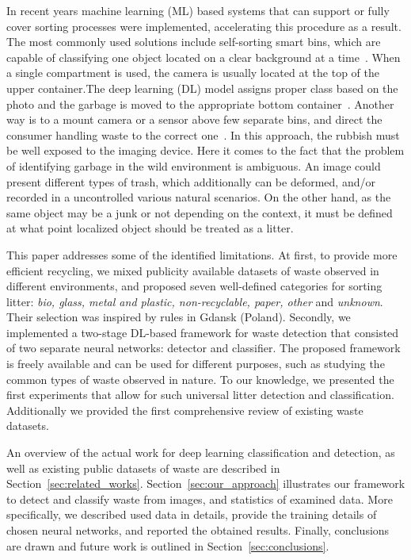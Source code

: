 \documentclass{article}
\begin{document}
In recent years machine learning (ML) based systems that can support or fully cover sorting processes were implemented, accelerating this procedure as a result. The most commonly used solutions include self-sorting smart bins, which are capable of classifying one object located on a clear background at a time~\cite{white2020wastenet,Sheng2020}. When a single compartment is used, the camera is usually located at the top of the upper container.The deep learning (DL) model assigns proper class based on the photo and the garbage is moved to the appropriate bottom container~\cite{white2020wastenet}. Another way is to a mount camera or a sensor above few separate bins, and direct the consumer handling waste to the correct one~\cite{IoWT2018}. In this approach, the rubbish must be well exposed to the imaging device. Here it comes to the fact that the problem of identifying garbage in the wild environment is ambiguous. An image could present different types of trash, which additionally can be deformed, and/or recorded in a uncontrolled various natural scenarios. On the other hand, as the same object may be a junk or not depending on the context, it must be defined at what point localized object should be treated as a litter.

This paper addresses some of the identified limitations. At first, to provide more efficient recycling, we mixed publicity available datasets of waste observed in different environments, and proposed seven well-defined categories for sorting litter: \textit{bio, glass, metal and plastic, non-recyclable, paper, other} and \textit{unknown}. Their selection was inspired by rules in Gdansk (Poland). Secondly, we implemented a two-stage DL-based framework for waste detection that consisted of two separate neural networks: detector and classifier. The proposed framework is freely available and can be used for different purposes, such as studying the common types of waste observed in nature. To our knowledge, we presented the first experiments that allow for such universal litter detection and classification. Additionally we provided the first comprehensive review of existing waste datasets.

An overview of the actual work for deep learning classification and detection, as well as existing public datasets of waste are described in Section~\ref{sec:related_works}. Section~\ref{sec:our_approach} illustrates our framework to detect and classify waste from images, and statistics of examined data. More specifically, we described used data in details, provide the training details of chosen neural networks, and reported the obtained results. Finally, conclusions are drawn and future work is outlined in Section~\ref{sec:conclusions}.
 
\end{document}
